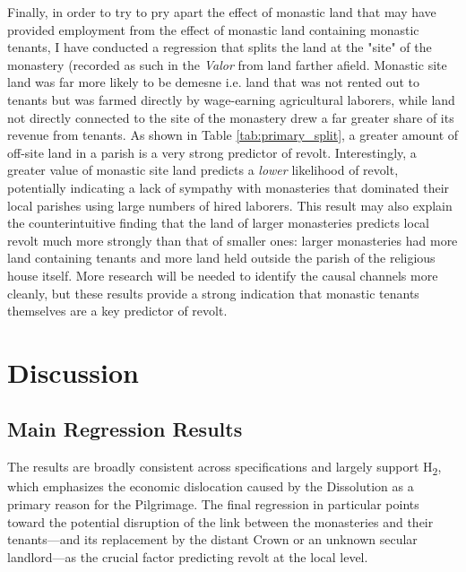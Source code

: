 \documentclass[12pt]{article}
\begin{document}


Finally, in order to try to pry apart the effect of monastic land that may have provided employment from the effect of monastic land containing monastic tenants, I have conducted a regression that splits the land at the "site" of the monastery (recorded as such in the \emph{Valor} from land farther afield. Monastic site land was far more likely to be demesne i.e. land that was not rented out to tenants but was farmed directly by wage-earning agricultural laborers, while land not directly connected to the site of the monastery drew a far greater share of its revenue from tenants. As shown in Table \ref{tab:primary_split}, a greater amount of off-site land in a parish is a very strong predictor of revolt. Interestingly, a greater value of monastic site land predicts a \emph{lower} likelihood of revolt, potentially indicating a lack of sympathy with monasteries that dominated their local parishes using large numbers of hired laborers. This result may also explain the counterintuitive finding that the land of larger monasteries predicts local revolt much more strongly than that of smaller ones: larger monasteries had more land containing tenants and more land held outside the parish of the religious house itself. More research will be needed to identify the causal channels more cleanly, but these results provide a strong indication that monastic tenants themselves are a key predictor of revolt.

\section{Discussion}
\subsection{Main Regression Results}

The results are broadly consistent across specifications and largely support H\textsubscript{2}, which emphasizes the economic dislocation caused by the Dissolution as a primary reason for the Pilgrimage. The final regression in particular points toward the potential disruption of the link between the monasteries and their tenants---and its replacement by the distant Crown or an unknown secular landlord---as the crucial factor predicting revolt at the local level.
\end{document}
